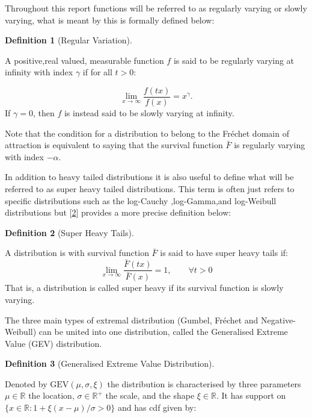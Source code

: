 \documentclass[
  10pt,
  a4paper,
]{scrreprt}
\theoremstyle{definition}
\newtheorem{definition}{Definition}[section]
\theoremstyle{plain}
\theoremstyle{plain}
\theoremstyle{plain}
\theoremstyle{remark}
\begin{document}
{Throughout this report functions will be referred to as regularly
varying or slowly varying, what is meant by this is formally defined
below:

\begin{definition}[Regular
Variation]\protect\hypertarget{def-rv}{}\label{def-rv}

A positive,real valued, measurable function \(f\) is said to be
regularly varying at infinity with index \(\gamma\) if for all \(t>0\):

\[
\lim_{x\rightarrow\infty}\displaystyle\frac{f(tx)}{f(x)} = x^{\gamma}.
\] If \(\gamma =0\), then \(f\) is instead said to be slowly varying at
infinity.

\end{definition}

Note that the condition for a distribution to belong to the Fréchet
domain of attraction is equivalent to saying that the survival function
\(\bar F\) is regularly varying with index \(-\alpha\).

In addition to heavy tailed distributions it is also useful to define
what will be referred to as super heavy tailed distributions. This term
is often just refers to specific distributions such as the log-Cauchy
,log-Gamma,and log-Weibull distributions but
{[}\protect\hyperlink{ref-fmh09}{2}{]} provides a more precise
definition below:

\begin{definition}[Super Heavy
Tails]\protect\hypertarget{def-sup}{}\label{def-sup}

A distribution is with survival function \(\bar F\) is said to have
super heavy tails if: \[
\lim_{x\rightarrow\infty}\displaystyle\frac{\bar F(tx)}{\bar F (x)} = 1,\qquad \forall t>0
\] That is, a distribution is called super heavy if its survival
function is slowly varying.

\end{definition}

The three main types of extremal distribution (Gumbel, Fréchet and
Negative-Weibull) can be united into one distribution, called the
Generalised Extreme Value (GEV) distribution.

\begin{definition}[Generalised Extreme Value
Distribution]\protect\hypertarget{def-gev}{}\label{def-gev}

Denoted by \(\text{GEV}(\mu,\sigma,\xi)\) the distribution is
characterised by three parameters \(\mu \in \mathbb R\) the location,
\(\sigma\in \mathbb R^+\) the scale, and the shape \(\xi\in \mathbb R\).
It has support on \(\{x\in \mathbb R:1+\xi(x-\mu)/\sigma > 0\}\) and has
cdf given by:


\end{definition}}
\end{document}
